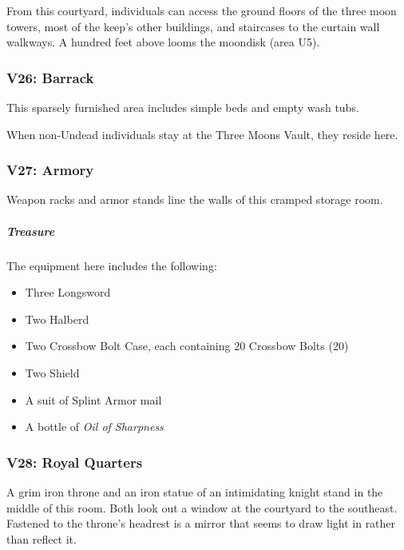 \documentclass[10pt,a4paper,twoside,bg=print,twocolumn,openany,nodeprecatedcode]{dndbook}
\begin{document}
From this courtyard, individuals can access the ground floors of the three moon towers, most of the keep's other buildings, and staircases to the curtain wall walkways. A hundred feet above looms the moondisk (area U5).

\subsubsection{V26: Barrack}
\begin{DndReadAloud}{}
This sparsely furnished area includes simple beds and empty wash tubs.

\end{DndReadAloud}

When non-Undead individuals stay at the Three Moons Vault, they reside here.

\subsubsection{V27: Armory}
\begin{DndReadAloud}{}
Weapon racks and armor stands line the walls of this cramped storage room.

\end{DndReadAloud}

\subparagraph{Treasure}
The equipment here includes the following:


\begin{itemize}
\item Three Longsword
\item Two Halberd
\item Two Crossbow Bolt Case, each containing 20 Crossbow Bolts (20)
\item Two Shield
\item A suit of Splint Armor mail
\item A bottle of \textit{Oil of Sharpness}
\end{itemize}

\subsubsection{V28: Royal Quarters}
\begin{DndReadAloud}{}
A grim iron throne and an iron statue of an intimidating knight stand in the middle of this room. Both look out a window at the courtyard to the southeast. Fastened to the throne's headrest is a mirror that seems to draw light in rather than reflect it.

\end{DndReadAloud}
\end{document}
